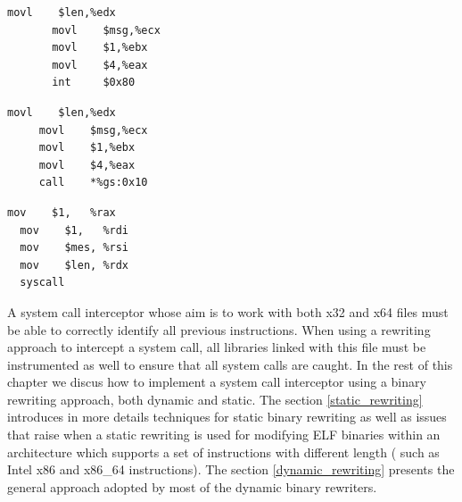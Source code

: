 \begin{multicols}{3}

\begin{center}
\lstset{escapechar=@,style=asm}
\begin{lstlisting}[caption=\relax]
       movl    $len,%edx       
       movl    $msg,%ecx       
       movl    $1,%ebx        
       movl    $4,%eax         
       int 	   $0x80
\end{lstlisting}
\end{center}

\begin{center}
\lstset{escapechar=@,style=asm}
\begin{lstlisting}[caption=\relax]
     movl    $len,%edx       
     movl    $msg,%ecx       
     movl    $1,%ebx        
     movl    $4,%eax         
     call    *%gs:0x10
\end{lstlisting}
\end{center}

\begin{center}
\lstset{escapechar=@,style=asm}
\begin{lstlisting}[caption=\relax]
  mov    $1,   %rax          
  mov    $1,   %rdi         
  mov    $mes, %rsi     
  mov    $len, %rdx      
  syscall

\end{lstlisting}
\end{center}

\end{multicols}


A system call interceptor whose aim is to work with both x32 and x64 files must be able to correctly identify all previous instructions. When using a rewriting approach to intercept a system call, all libraries linked with this file must be instrumented as well to ensure that all system calls are caught. In the rest of this chapter we discus how to implement a system call interceptor using a binary rewriting approach, both dynamic and static. The section \ref{static_rewriting} introduces in more details techniques for static binary rewriting as well as issues that raise when a static rewriting is used for modifying ELF binaries within an architecture which supports  a set of instructions with different length ( such as Intel x86 and x86\_64 instructions). The section \ref{dynamic_rewriting} presents the general approach adopted by most of the dynamic binary rewriters. 

 
